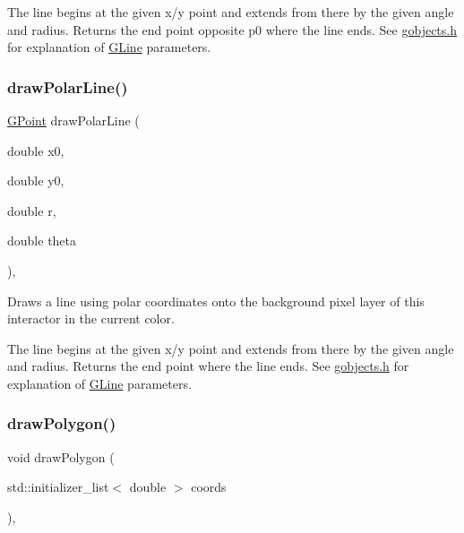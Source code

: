 The line begins at the given x/y point and extends from there by the given angle and radius. Returns the end point opposite p0 where the line ends. See \mbox{\hyperlink{gobjects_8h_source}{gobjects.\+h}} for explanation of \mbox{\hyperlink{classGLine}{G\+Line}} parameters. \mbox{\label{classGDrawingSurface_ad3e646f90005295f2bbdf37d2bcb39d2}} 
\subsubsection{\texorpdfstring{draw\+Polar\+Line()}{drawPolarLine()}\hspace{0.1cm}{\footnotesize\ttfamily [2/2]}}
{\footnotesize\ttfamily \mbox{\hyperlink{classGPoint}{G\+Point}} draw\+Polar\+Line (\begin{DoxyParamCaption}\item[{double}]{x0,  }\item[{double}]{y0,  }\item[{double}]{r,  }\item[{double}]{theta }\end{DoxyParamCaption})\hspace{0.3cm}{\ttfamily [virtual]}, {\ttfamily [inherited]}}



Draws a line using polar coordinates onto the background pixel layer of this interactor in the current color. 

The line begins at the given x/y point and extends from there by the given angle and radius. Returns the end point where the line ends. See \mbox{\hyperlink{gobjects_8h_source}{gobjects.\+h}} for explanation of \mbox{\hyperlink{classGLine}{G\+Line}} parameters. \mbox{\label{classGDrawingSurface_afddec0a905108d8a8d6809a157f26776}} 
\subsubsection{\texorpdfstring{draw\+Polygon()}{drawPolygon()}\hspace{0.1cm}{\footnotesize\ttfamily [1/2]}}
{\footnotesize\ttfamily void draw\+Polygon (\begin{DoxyParamCaption}\item[{std\+::initializer\+\_\+list$<$ double $>$}]{coords }\end{DoxyParamCaption})\hspace{0.3cm}{\ttfamily [virtual]}, {\ttfamily [inherited]}}



